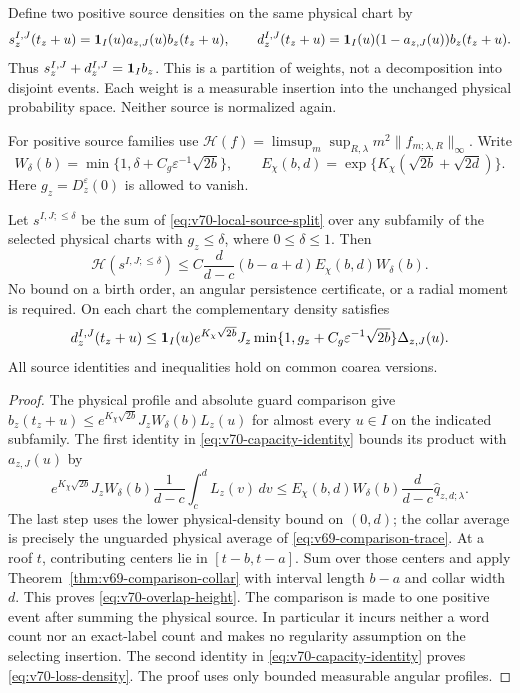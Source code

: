 Define two positive source densities on the same physical chart by
\begin{equation}\label{eq:v70-local-source-split}
 s_z^{I,J}(t_z+u)=\one_I(u)a_{z,J}(u)b_z(t_z+u),\qquad
 d_z^{I,J}(t_z+u)=\one_I(u)(1-a_{z,J}(u))b_z(t_z+u).
\end{equation}
Thus $s_z^{I,J}+d_z^{I,J}=\mathbf1_I b_z$. This is a partition of
weights, not a decomposition into disjoint events. Each weight is a
measurable insertion into the unchanged physical probability space.
Neither source is normalized again.

For positive source families use
$\mathcal H(f)=\limsup_m\sup_{R,\lambda}m^2\|f_{m;\lambda,R}\|_\infty$.
Write
\[
 W_\delta(b)=\min\{1,\delta+C_g\varepsilon^{-1}\sqrt{2b}\},\qquad
 E_\chi(b,d)=\exp\{K_\chi(\sqrt{2b}+\sqrt{2d})\}.
\]
Here $g_z=D_z^\varepsilon(0)$ is allowed to vanish.

\begin{theorem}
\label{thm:v70-overlap-height}
Let $s^{I,J;\le\delta}$ be the sum of
\eqref{eq:v70-local-source-split} over any subfamily of the selected
physical charts with $g_z\le\delta$, where $0\le\delta\le1$.
Then
\begin{equation}\label{eq:v70-overlap-height}
 \mathcal H(s^{I,J;\le\delta})
 \le C\frac{d}{d-c}(b-a+d)E_\chi(b,d)W_\delta(b).
\end{equation}
No bound on a birth order, an angular persistence certificate, or a
radial moment is required. On each chart the complementary density
satisfies
\begin{equation}\label{eq:v70-loss-density}
 d_z^{I,J}(t_z+u)
 \le\one_I(u)e^{K_\chi\sqrt{2b}}J_z
          \min\{1,g_z+C_g\varepsilon^{-1}\sqrt{2b}\}
          \Delta_{z,J}(u).
\end{equation}
All source identities and inequalities hold on common coarea versions.
\end{theorem}
\begin{proof}
The physical profile and absolute guard comparison give
$b_z(t_z+u)\le e^{K_\chi\sqrt{2b}}J_zW_\delta(b)L_z(u)$
for almost every $u\in I$ on the indicated subfamily. The first
identity in \eqref{eq:v70-capacity-identity} bounds its product
with $a_{z,J}(u)$ by
\[
 e^{K_\chi\sqrt{2b}}J_zW_\delta(b)
            \frac1{d-c}\int_c^d L_z(v)\,dv
 \le E_\chi(b,d)W_\delta(b)\frac{d}{d-c}
                         \widehat q_{z,d;\lambda}.
\]
The last step uses the lower physical-density bound on $(0,d)$;
the collar average is precisely the unguarded physical average of
\eqref{eq:v69-comparison-trace}. At a roof $t$, contributing
centers lie in $[t-b,t-a]$. Sum over those centers and apply
Theorem~\ref{thm:v69-comparison-collar} with interval length $b-a$
and collar width $d$. This proves \eqref{eq:v70-overlap-height}.
The comparison is made to one positive event after summing the
physical source. In particular it incurs neither a word count nor
an exact-label count and makes no regularity assumption on the
selecting insertion. The second identity in
\eqref{eq:v70-capacity-identity} proves \eqref{eq:v70-loss-density}.
The proof uses only bounded measurable angular profiles.
\end{proof}

